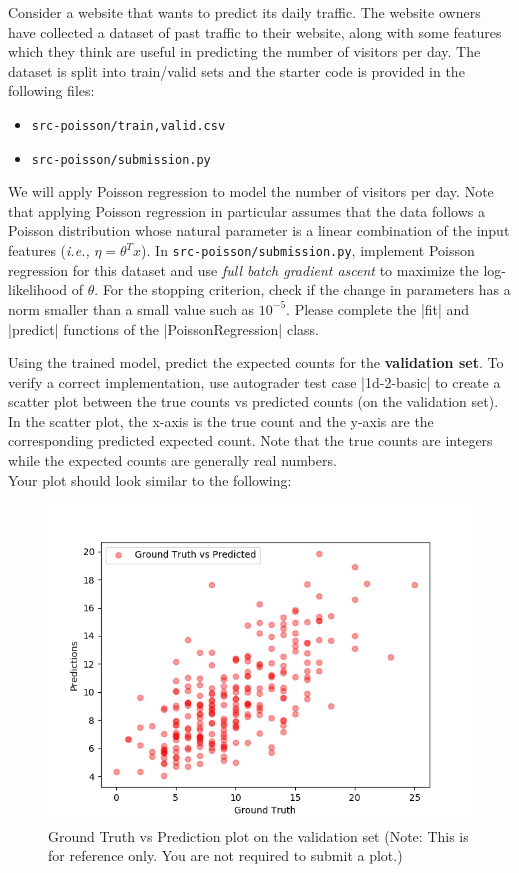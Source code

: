 \item {}

Consider a website that wants to predict its daily traffic. The website owners have collected a dataset of past traffic to their website, along with some features which they think are useful in
predicting the number of visitors per day. The dataset is split into train/valid sets and the starter code is provided in the following files:
\begin{center}
    \begin{itemize}
        \item 	\texttt{src-poisson/{train,valid}.csv}
        \item   \texttt{src-poisson/submission.py}
    \end{itemize}
\end{center}
We will apply Poisson regression to model the number of visitors per day. Note that applying Poisson regression in particular assumes that the data follows a Poisson distribution whose natural parameter is a linear combination of the input features (\emph{i.e.,} $\eta = \theta^T x$). In \texttt{src-poisson/submission.py}, implement Poisson regression for this dataset and use \emph{full batch gradient ascent} to maximize the log-likelihood of $\theta$. For the stopping criterion, check if the change in parameters has a norm smaller than a small value such as $10^{-5}$. Please complete the |fit| and |predict| functions of the |PoissonRegression| class. 

Using the trained model, predict the expected counts for the \textbf{validation set}.  To verify a correct implementation, use autograder test case |1d-2-basic| to create a scatter plot between the true counts vs predicted counts (on the validation set). In the scatter plot, the x-axis is the true count and the y-axis are the corresponding predicted expected count. Note that the true counts are integers while the expected counts are generally real numbers.\\

Your plot should look similar to the following:

\begin{figure}[H]
	\centering
	\vspace{-2mm}
	\includegraphics[width=0.65\linewidth]{01-poisson/poisson_val.png}
	\caption{Ground Truth vs Prediction plot on the validation set (Note: This is for reference only.  You are not required to submit a plot.)}
\end{figure}